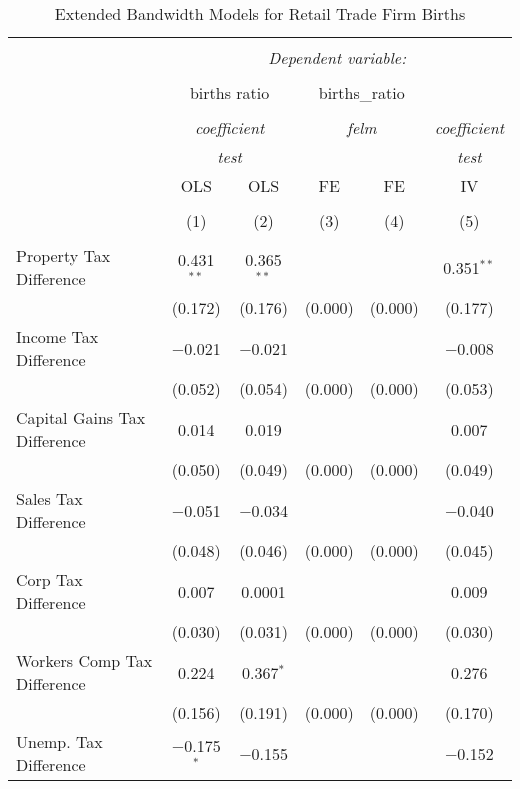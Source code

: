 
\begin{table}[!htbp] \centering 
  \caption{Extended Bandwidth Models for  Retail Trade Firm Births} 
  \label{} 
\begin{tabular}{@{\extracolsep{5pt}}lccccc} 
\\[-1.8ex]\hline 
\hline \\[-1.8ex] 
 & \multicolumn{5}{c}{\textit{Dependent variable:}} \\ 
\cline{2-6} 
\\[-1.8ex] & \multicolumn{2}{c}{births ratio} & \multicolumn{2}{c}{births\_ratio} &   \\ 
\\[-1.8ex] & \multicolumn{2}{c}{\textit{coefficient}} & \multicolumn{2}{c}{\textit{felm}} & \textit{coefficient} \\ 
 & \multicolumn{2}{c}{\textit{test}} & \multicolumn{2}{c}{\textit{}} & \textit{test} \\ 
 & OLS & OLS & FE & FE & IV \\ 
\\[-1.8ex] & (1) & (2) & (3) & (4) & (5)\\ 
\hline \\[-1.8ex] 
 Property Tax Difference & 0.431$^{**}$ & 0.365$^{**}$ &  &  & 0.351$^{**}$ \\ 
  & (0.172) & (0.176) & (0.000) & (0.000) & (0.177) \\ 
  Income Tax Difference & $-$0.021 & $-$0.021 &  &  & $-$0.008 \\ 
  & (0.052) & (0.054) & (0.000) & (0.000) & (0.053) \\ 
  Capital Gains Tax Difference & 0.014 & 0.019 &  &  & 0.007 \\ 
  & (0.050) & (0.049) & (0.000) & (0.000) & (0.049) \\ 
  Sales Tax Difference & $-$0.051 & $-$0.034 &  &  & $-$0.040 \\ 
  & (0.048) & (0.046) & (0.000) & (0.000) & (0.045) \\ 
  Corp Tax Difference & 0.007 & 0.0001 &  &  & 0.009 \\ 
  & (0.030) & (0.031) & (0.000) & (0.000) & (0.030) \\ 
  Workers Comp Tax Difference & 0.224 & 0.367$^{*}$ &  &  & 0.276 \\ 
  & (0.156) & (0.191) & (0.000) & (0.000) & (0.170) \\ 
  Unemp. Tax Difference & $-$0.175$^{*}$ & $-$0.155 &  &  & $-$0.152 \\ 

\end{tabular}
\end{table}
